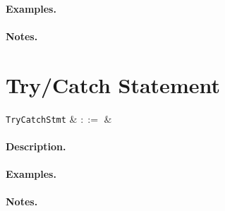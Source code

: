 \paragraph{Examples.}

\paragraph{Notes.} 


\section{Try/Catch Statement}

\begin{syntax}
  \verb+TryCatchStmt+ & $::=$ &\\
\end{syntax}

\paragraph{Description.}

\paragraph{Examples.}

\paragraph{Notes.} 
